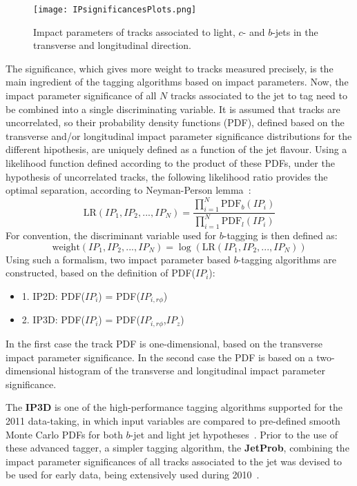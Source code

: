 \begin{figure}[htbp]
  \begin{center}
      \texttt{[image: IPsignificancesPlots.png]}
    \caption{Impact parameters of tracks associated to light, $c$- and $b$-jets in the transverse and longitudinal direction.}
    \label{fig:IPsignificance}
  \end{center}
\end{figure}

The significance, which gives more weight to tracks measured precisely, is the main ingredient of the tagging algorithms based on impact parameters. Now, the impact parameter significance of all $N$ tracks associated to the jet to tag need to be combined into a single discriminating variable. It is assumed that tracks are uncorrelated, so their probability density functions (PDF), defined based on the transverse and/or longitudinal impact parameter significance distributions for the different hipothesis, are uniquely  defined as a function of the jet flavour. Using a likelihood function defined according to the product of these PDFs, under the hypothesis of uncorrelated tracks, the following likelihood ratio provides the optimal separation, according to Neyman-Person lemma~\cite{1933RSPTA.231..289N}:
%
\begin{equation}
\text{LR}(IP_1,IP_2,...,IP_N) = \frac{\prod_{i=1}^N \text{PDF}_b(IP_i)}{\prod_{i=1}^N \text{PDF}_l(IP_i)}
\end{equation}
%
For convention, the discriminant variable used for $b$-tagging is then defined as:
%
\begin{equation}
\text{weight}(IP_1,IP_2,...,IP_N) = \log(\text{LR}(IP_1,IP_2,...,IP_N))
\end{equation}
%
Using such a formalism, two impact parameter based $b$-tagging algorithms are constructed, based on the definition of PDF($IP_i$):

\begin{itemize}
\item
1. IP2D: PDF($IP_i$) = PDF($IP_{i,r\phi}$)
\item
2. IP3D:  PDF($IP_i$) = PDF($IP_{i,r\phi}$,$IP_z$)
\end{itemize}

In the first case the track PDF is one-dimensional, based on the transverse impact parameter significance. In the second case the PDF is based on a two-dimensional histogram of the transverse and longitudinal impact parameter significance. 

The \textbf{IP3D} is one of the high-performance tagging algorithms supported for the 2011 data-taking, in which input variables are compared to pre-defined smooth Monte Carlo PDFs for both $b$-jet and light jet hypotheses~\cite{ATLAS-CONF-2011-102}.  Prior to the use of these advanced tagger, a simpler tagging algorithm, the \textbf{JetProb}, combining the impact parameter significances of all tracks associated to the jet was devised to be used for early data, being extensively used during 2010~\cite{ATLAS-CONF-2010-091}. 


